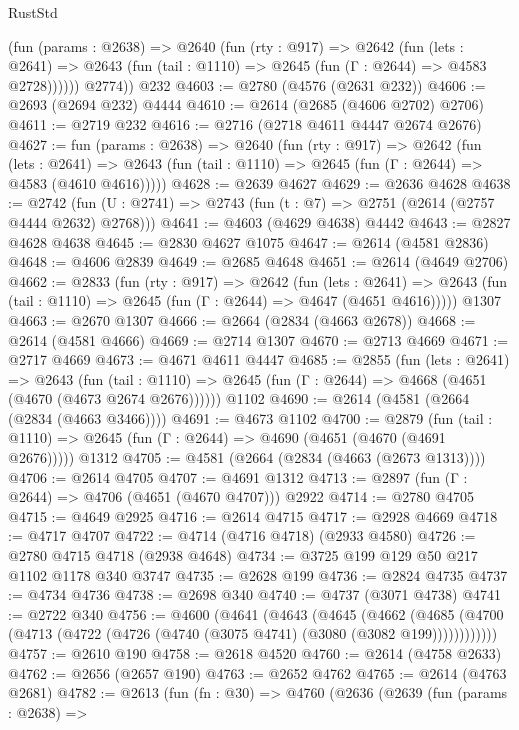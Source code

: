 \begin{lexlean}{RustStd}
\begin{coremodule}
          (fun (params : @2638) =>
          @2640
            (fun (rty : @917) =>
            @2642
              (fun (lets : @2641) =>
              @2643 (fun (tail : @1110) => @2645 (fun (Γ : @2644) => @4583 @2728))))))
        @2774))
    @232
@4603 := @2780 (@4576 (@2631 @232))
@4606 := @2693 (@2694 @232) @4444
@4610 := @2614 (@2685 (@4606 @2702) @2706)
@4611 := @2719 @232
@4616 := @2716 (@2718 @4611 @4447 @2674 @2676)
@4627 := fun (params : @2638) =>
  @2640
    (fun (rty : @917) =>
    @2642
      (fun (lets : @2641) =>
      @2643 (fun (tail : @1110) => @2645 (fun (Γ : @2644) => @4583 (@4610 @4616)))))
@4628 := @2639 @4627
@4629 := @2636 @4628
@4638 := @2742 (fun (U : @2741) => @2743 (fun (t : @7) => @2751 (@2614 (@2757 @4444 @2632) @2768)))
@4641 := @4603 (@4629 @4638) @4442
@4643 := @2827 @4628 @4638
@4645 := @2830 @4627 @1075
@4647 := @2614 (@4581 @2836)
@4648 := @4606 @2839
@4649 := @2685 @4648
@4651 := @2614 (@4649 @2706)
@4662 := @2833
    (fun (rty : @917) =>
    @2642
      (fun (lets : @2641) =>
      @2643 (fun (tail : @1110) => @2645 (fun (Γ : @2644) => @4647 (@4651 @4616)))))
    @1307
@4663 := @2670 @1307
@4666 := @2664 (@2834 (@4663 @2678))
@4668 := @2614 (@4581 @4666)
@4669 := @2714 @1307
@4670 := @2713 @4669
@4671 := @2717 @4669
@4673 := @4671 @4611 @4447
@4685 := @2855
    (fun (lets : @2641) =>
    @2643
      (fun (tail : @1110) => @2645 (fun (Γ : @2644) => @4668 (@4651 (@4670 (@4673 @2674 @2676))))))
    @1102
@4690 := @2614 (@4581 (@2664 (@2834 (@4663 @3466))))
@4691 := @4673 @1102
@4700 := @2879
    (fun (tail : @1110) => @2645 (fun (Γ : @2644) => @4690 (@4651 (@4670 (@4691 @2676)))))
    @1312
@4705 := @4581 (@2664 (@2834 (@4663 (@2673 @1313))))
@4706 := @2614 @4705
@4707 := @4691 @1312
@4713 := @2897 (fun (Γ : @2644) => @4706 (@4651 (@4670 @4707))) @2922
@4714 := @2780 @4705
@4715 := @4649 @2925
@4716 := @2614 @4715
@4717 := @2928 @4669
@4718 := @4717 @4707
@4722 := @4714 (@4716 @4718) (@2933 @4580)
@4726 := @2780 @4715 @4718 (@2938 @4648)
@4734 := @3725 @199 @129 @50 @217 @1102 @1178 @340 @3747
@4735 := @2628 @199
@4736 := @2824 @4735
@4737 := @4734 @4736
@4738 := @2698 @340
@4740 := @4737 (@3071 @4738)
@4741 := @2722 @340
@4756 := @4600
    (@4641
      (@4643
        (@4645
          (@4662
            (@4685 (@4700 (@4713 (@4722 (@4726 (@4740 (@3075 @4741) (@3080 (@3082 @199))))))))))))
@4757 := @2610 @190
@4758 := @2618 @4520
@4760 := @2614 (@4758 @2633)
@4762 := @2656 (@2657 @190)
@4763 := @2652 @4762
@4765 := @2614 (@4763 @2681)
@4782 := @2613
    (fun (fn : @30) =>
    @4760
      (@2636
        (@2639
          (fun (params : @2638) =>

\end{coremodule}
\end{lexlean}
